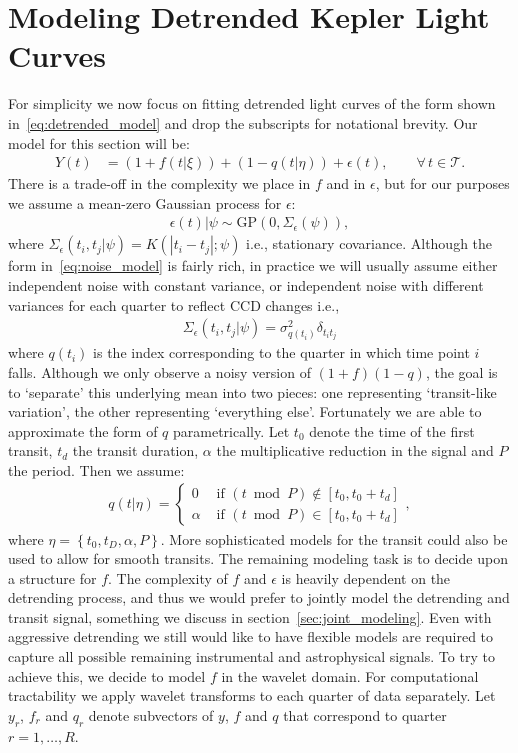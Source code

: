 \documentclass[a4paper,11pt]{article}
\begin{document}
\section{Modeling Detrended Kepler Light Curves}
For simplicity we now focus on fitting detrended light curves of the form shown in~\eqref{eq:detrended_model} and drop the subscripts for notational brevity. Our model for this section will be:
\begin{align}
\label{eq:simpler_detrended_model}
 Y(t) &= (1+f(t|\xi)) + (1-q(t|\eta)) + \epsilon(t) , \qquad \forall \, t \in \mathcal{T} .
\end{align}
There is a trade-off in the complexity we place in $f$ and in $\epsilon$, but for our purposes we assume a mean-zero Gaussian process for $\epsilon$:
\begin{align}\label{eq:noise_model}
\epsilon(t)|\psi \sim \textrm{GP}\left(0,\Sigma_{\epsilon}(\psi)\right) ,
\end{align}
where $\Sigma_{\epsilon}(t_{i},t_{j}|\psi)=K(|t_{i}-t_{j}|;\psi)$ i.e., stationary covariance. Although the form in~\eqref{eq:noise_model} is fairly rich, in practice we will usually assume either independent noise with constant variance, or independent noise with different variances for each quarter to reflect CCD changes i.e.,
\begin{align*}
  \Sigma_{\epsilon}(t_{i},t_{j}|\psi)=\sigma_{q(t_{i})}^{2}\delta_{t_{i}t_{j}}
 \end{align*}
 where $q(t_{i})$ is the index corresponding to the quarter in which time point $i$ falls. Although we only observe a noisy version of $(1+f)(1-q)$, the goal is to \lq{}separate\rq{} this underlying mean into two pieces: one representing \lq{}transit-like variation\rq{}, the other representing \lq{}everything else\rq{}. Fortunately we are able to approximate the form of $q$ parametrically. Let $t_{0}$ denote the time of the first transit, $t_{d}$ the transit duration, $\alpha$ the multiplicative reduction in the signal and $P$ the period. Then we assume:
\begin{align*}
 q(t|\eta) = \left\{ \begin{array}{cl}
 0 & \textrm{ if } (t\bmod{P}) \notin{} \left[t_{0},t_{0}+t_{d}\right] \\
 \alpha & \textrm{ if }  (t\bmod{P}) \in \left[t_{0},t_{0}+t_{d}\right] 
 \end{array}\right. ,
\end{align*}
where $\eta=\left\{t_{0},t_{D},\alpha,P\right\}$. More sophisticated models for the transit could also be used to allow for smooth transits. The remaining modeling task is to decide upon a structure for $f$. The complexity of $f$ and $\epsilon$ is heavily dependent on the detrending process, and thus we would prefer to jointly model the detrending and transit signal, something we discuss in section~\ref{sec:joint_modeling}. Even with aggressive detrending we still would like to have flexible models are required to capture all possible remaining instrumental and astrophysical signals. To try to achieve this, we decide to model $f$ in the wavelet domain. For computational tractability we apply wavelet transforms to each quarter of data separately. Let $y_{r}$, $f_{r}$ and $q_{r}$ denote subvectors of $y$, $f$ and $q$ that correspond to quarter $r=1,\ldots,R$. 
\end{document}
